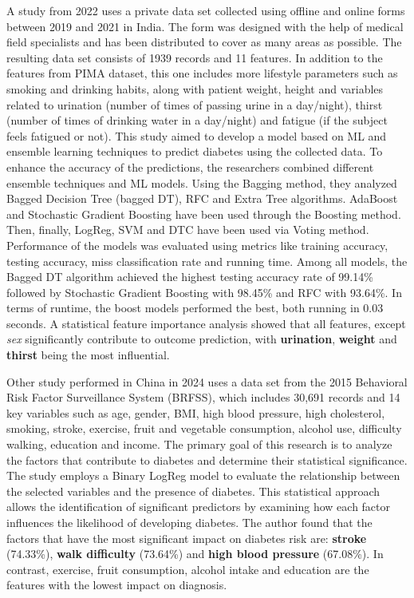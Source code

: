 \documentclass[runningheads]{llncs}
\begin{document}
A study \cite{GANIE2022100092} from 2022 uses a private data set collected using offline and online forms between 2019 and 2021 in India. The form was designed with the help of medical field specialists and has been distributed to cover as many areas as possible. The resulting data set consists of 1939 records and 11 features. In addition to the features from PIMA dataset, this one includes more lifestyle parameters such as smoking and drinking habits, along with patient weight, height and variables related to urination (number of times of passing urine in a day/night), thirst (number of times of drinking water in a day/night) and fatigue (if the subject feels fatigued or not). 
This study aimed to develop a model based on ML and ensemble learning techniques to predict diabetes using the collected data.
To enhance the accuracy of the predictions, the researchers combined different ensemble techniques and ML models. Using the Bagging method, they analyzed Bagged Decision Tree (bagged DT), RFC and Extra Tree algorithms. AdaBoost and Stochastic Gradient Boosting have been used through the Boosting method. Then, finally, LogReg, SVM and DTC have been used via Voting method. 
Performance of the models was evaluated using metrics like training accuracy, testing accuracy, miss classification rate and running time. Among all models, the Bagged DT algorithm achieved the highest testing accuracy rate of 99.14\% followed by Stochastic Gradient Boosting with 98.45\% and RFC with 93.64\%. In terms of runtime, the boost models performed the best, both running in 0.03 seconds. A statistical feature importance analysis showed that all features, except \textit{sex} significantly contribute to outcome prediction, with \textbf{urination}, \textbf{weight} and \textbf{thirst} being the most influential. 

Other study \cite{Xu2024} performed in China in 2024 uses a data set from the 2015 Behavioral Risk Factor Surveillance System (BRFSS), which includes 30,691 records and 14 key variables such as age, gender, BMI, high blood pressure, high cholesterol, smoking, stroke, exercise, fruit and vegetable consumption, alcohol use, difficulty walking, education and income. 
The primary goal of this research is to analyze the factors that contribute to diabetes and determine their statistical significance. 
The study employs a Binary LogReg model to evaluate the relationship between the selected variables and the presence of diabetes. This statistical approach allows the identification of significant predictors by examining how each factor influences the likelihood of developing diabetes. 
The author found that the factors that have the most significant impact on diabetes risk are: \textbf{stroke} (74.33\%), \textbf{walk difficulty} (73.64\%) and \textbf{high blood pressure} (67.08\%). In contrast, exercise, fruit consumption, alcohol intake and education are the features with the lowest impact on diagnosis.
\end{document}
